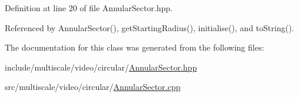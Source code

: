 Definition at line 20 of file Annular\-Sector.\-hpp.



Referenced by Annular\-Sector(), get\-Starting\-Radius(), initialise(), and to\-String().



The documentation for this class was generated from the following files\-:\begin{DoxyCompactItemize}
\item 
include/multiscale/video/circular/\hyperlink{AnnularSector_8hpp}{Annular\-Sector.\-hpp}\item 
src/multiscale/video/circular/\hyperlink{AnnularSector_8cpp}{Annular\-Sector.\-cpp}\end{DoxyCompactItemize}
